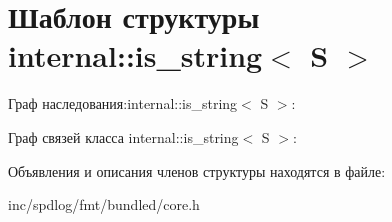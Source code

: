 \hypertarget{structinternal_1_1is__string}{}\section{Шаблон структуры internal\+:\+:is\+\_\+string$<$ S $>$}
\label{structinternal_1_1is__string}


Граф наследования\+:internal\+:\+:is\+\_\+string$<$ S $>$\+:


Граф связей класса internal\+:\+:is\+\_\+string$<$ S $>$\+:


Объявления и описания членов структуры находятся в файле\+:\begin{DoxyCompactItemize}
\item 
inc/spdlog/fmt/bundled/core.\+h\end{DoxyCompactItemize}

